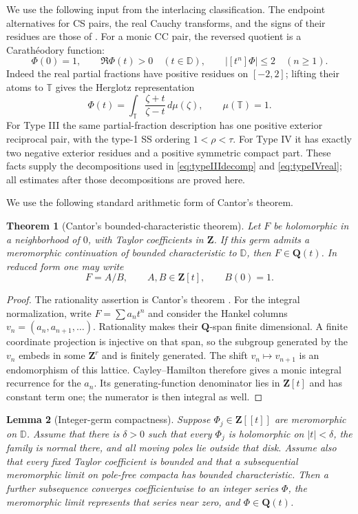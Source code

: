 \documentclass[11pt,reqno]{amsart}
\newtheorem{theorem}{Theorem}[section]
\newtheorem{lemma}[theorem]{Lemma}
\theoremstyle{definition}
\theoremstyle{remark}
\newcommand{\D}{\mathbb D}
\newcommand{\T}{\mathbb T}
\newcommand{\Q}{\mathbf Q}
\newcommand{\Z}{\mathbf Z}
\begin{document}
We use the following input from the interlacing classification.  The endpoint
alternatives for CS pairs, the real Cauchy transforms, and the signs of their
residues are those of \cite[Secs.~2.3--2.5 and Thm.~7.3]{mckeesmyth}.
For a monic CC pair, the reversed quotient is a Carath\'eodory function:
\begin{equation}\label{eq:caratheodory}
 \Phi(0)=1,\qquad \Re\Phi(t)>0\quad(t\in\D),\qquad
 |[t^n]\Phi|\le2\quad(n\ge1).
\end{equation}
Indeed the real partial fractions have positive residues on $[-2,2]$;
lifting their atoms to $\T$ gives the Herglotz representation
\[
 \Phi(t)=\int_{\T}\frac{\zeta+t}{\zeta-t}\,d\mu(\zeta),
 \qquad \mu(\T)=1.
\]
For Type III the same partial-fraction description has one positive exterior
reciprocal pair, with the type-1 SS ordering $1<\rho<\tau$.  For Type IV it has
exactly two negative exterior residues and a positive symmetric compact
part.  These facts supply the decompositions used in
\eqref{eq:typeIIIdecomp} and \eqref{eq:typeIVreal}; all estimates after those
decompositions are proved here.

We use the following standard arithmetic form of Cantor's theorem.

\begin{theorem}[Cantor's bounded-characteristic theorem]\label{thm:cantor}
Let $F$ be holomorphic in a neighborhood of $0$, with Taylor coefficients in
$\Z$.  If this germ admits a meromorphic continuation of bounded
characteristic to $\D$, then $F\in\Q(t)$.  In reduced form one may write
\[
 F=A/B,\qquad A,B\in\Z[t],\qquad B(0)=1.
\]
\end{theorem}

\begin{proof}
The rationality assertion is Cantor's theorem \cite{cantor}.  For the
integral normalization, write $F=\sum a_nt^n$ and consider the Hankel columns
$v_n=(a_n,a_{n+1},\ldots)$.  Rationality makes their $\Q$-span finite
dimensional.  A finite coordinate projection is injective on that span, so
the subgroup generated by the $v_n$ embeds in some $\Z^r$ and is finitely
generated.  The shift $v_n\mapsto v_{n+1}$ is an endomorphism of this
lattice.  Cayley--Hamilton therefore gives a monic integral recurrence for
the $a_n$.  Its generating-function denominator lies in $\Z[t]$ and has
constant term one; the numerator is then integral as well.
\end{proof}

\begin{lemma}[Integer-germ compactness]\label{lem:compactness}
Suppose $\Phi_j\in\Z[[t]]$ are meromorphic on $\D$.  Assume that there is
$\delta>0$ such that every $\Phi_j$ is holomorphic on $|t|<\delta$, the family
is normal there, and all moving poles lie outside that disk.  Assume also
that every fixed Taylor coefficient is bounded and that a subsequential
meromorphic limit on pole-free compacta has bounded characteristic.  Then a
further subsequence converges coefficientwise to an integer series $\Phi$,
the meromorphic limit represents that series near zero, and
$\Phi\in\Q(t)$.
\end{lemma}
\end{document}
